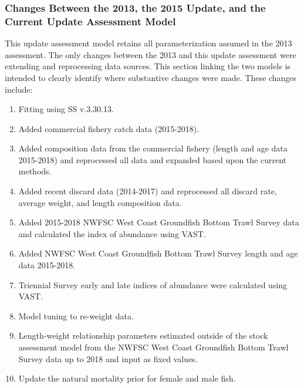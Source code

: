 \documentclass[12pt,]{article}
\begin{document}
\subsubsection{Changes Between the 2013, the 2015 Update, and the
Current Update Assessment
Model}\label{changes-between-the-2013-the-2015-update-and-the-current-update-assessment-model}

This update assessment model retains all parameterization assumed in the
2013 assessment. The only changes between the 2013 and this update
assessment were extending and reprocessing data sources. This section
linking the two models is intended to clearly identify where substantive
changes were made. These changes include:

\begin{enumerate}

\item Fitting using SS v.3.30.13.

\item Added commercial fishery catch data (2015-2018).

\item Added composition data from the commercial fishery (length and age data 2015-2018) and reprocessed all data and expanded based upon the current methods.

\item Added recent discard data (2014-2017) and reprocessed all discard rate, average weight, and length composition data.

\item Added 2015-2018 NWFSC West Coast Groundfish Bottom Trawl Survey  data and calculated the index of abundance using VAST.

\item Added NWFSC West Coast Groundfish Bottom Trawl Survey length and age data 2015-2018.

\item Triennial Survey early and late indices of abundance were calculated using VAST.

\item Model tuning to re-weight data. 

\item Length-weight relationship parameters estimated outside of the stock assessment model from the NWFSC West Coast Groundfish Bottom Trawl Survey data up to 2018 and input as fixed values.

\item Update the natural mortality prior for female and male fish.

\end{enumerate}
\end{document}
